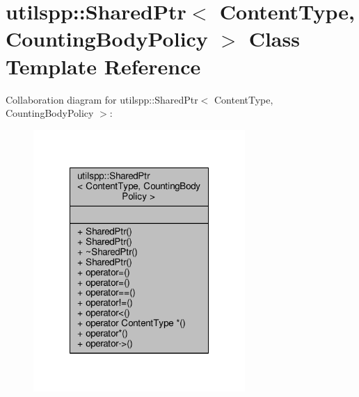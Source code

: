 \hypertarget{classutilspp_1_1SharedPtr}{\section{utilspp\-:\-:Shared\-Ptr$<$ Content\-Type, Counting\-Body\-Policy $>$ Class Template Reference}
\label{classutilspp_1_1SharedPtr}
}


Collaboration diagram for utilspp\-:\-:Shared\-Ptr$<$ Content\-Type, Counting\-Body\-Policy $>$\-:\nopagebreak
\begin{figure}[H]
\begin{center}
\leavevmode
\includegraphics[width=228pt]{classutilspp_1_1SharedPtr__coll__graph}
\end{center}
\end{figure}
